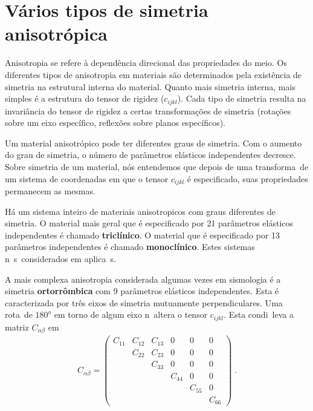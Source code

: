 \section{V\'arios tipos de simetria anisotr\'opica}

Anisotropia se refere \`a depend\^encia direcional das propriedades do meio.
Os diferentes tipos de anisotropia em materiais s\~ao determinados
pela exist\^encia de simetria na estrutural interna do material.
Quanto mais simetria interna, mais simples \'e a estrutura do tensor de
rigidez ($c_{ijkl}$). Cada tipo de simetria resulta na invari\^ancia
do tensor de rigidez a certas transforma\c{c}\~oes de simetria
(rota\c{c}\~oes sobre um eixo espec\'ifico, reflex\~oes sobre planos
espec\'ificos).

Um material anisotr\'opico pode ter diferentes graus de
simetria. Com o aumento do grau de simetria, o n\'umero
de par\^ametros el\'asticos independentes decresce. Sobre
simetria de um material, n\'os entendemos que depois de uma
transforma\cao\ de um sistema de coordenadas em que o tensor
$c_{ijkl}$ \'e especificado, suas propriedades permanecem
as mesmas.

H\'a um sistema inteiro de materiais anisotropicos com
graus diferentes de simetria. O material mais geral que
\'e especificado por 21 par\^ametros el\'asticos
independentes \'e chamado {\bf tricl\'inico}. O material que
\'e especificado por 13 par\^ametros independentes \'e
chamado {\bf monocl\'inico}. Estes sistemas n\ao\ s\ao\
considerados em aplica\coes\ s\ismicas.

A mais complexa anisotropia considerada algumas vezes em 
sismologia \'e a simetria {\bf ortorr\^ombica} com 9
par\^ametros el\'asticos independentes. Esta \'e
caracterizada por tr\^es eixos de simetria mutuamente
perpendiculares. Uma rota\cao\ de $180^{o}$ em
torno de algum eixo n\ao\ altera o tensor $c_{ijkl}$.
Esta condi\cao\ leva a matriz $C_{\alpha \beta}$ em
\begin{eqnarray}
C_{\alpha \beta} = \left(
\begin{array}{cccccc}
C_{11} & C_{12} & C_{13} & 0      & 0      & 0 \\
       & C_{22} & C_{23} & 0      & 0      & 0 \\
       &        & C_{33} & 0      & 0      & 0 \\
       &        &        & C_{44} & 0      & 0 \\
       &        &        &        & C_{55} & 0 \\
       &        &        &        &        & C_{66}
\end{array} \right) \; .
\end{eqnarray}

